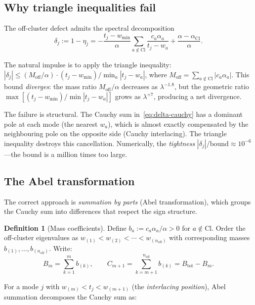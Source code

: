 \documentclass[12pt,a4paper]{article}
\theoremstyle{definition}
\newtheorem{definition}[theorem]{Definition}
\theoremstyle{remark}
\newcommand{\Cl}{\mathrm{Cl}}
\newcommand{\off}{\mathrm{off}}
\newcommand{\wmin}{w_{\min}}
\begin{document}
\subsection{Why triangle inequalities fail}

The off-cluster defect admits the spectral decomposition
\begin{equation}
\label{eq:delta-cauchy}
\delta_j := 1 - \eta_j
= -\frac{t_j - \wmin}{\alpha}
\sum_{a \notin \Cl} \frac{c_a \alpha_a}{t_j - w_a}
+ \frac{\alpha - \alpha_{\Cl}}{\alpha}.
\end{equation}

The natural impulse is to apply the triangle inequality:
$|\delta_j| \leq (M_{\off}/\alpha) \cdot (t_j - \wmin) / \min_a |t_j - w_a|$,
where $M_{\off} = \sum_{a \notin \Cl} |c_a \alpha_a|$.
This bound \emph{diverges}: the mass ratio $M_{\off}/\alpha$ decreases as
$\lambda^{-1.8}$, but the geometric ratio $\max[(t_j-\wmin)/\min|t_j-w_a|]$
grows as $\lambda^{+7}$, producing a net divergence.

The failure is structural.
The Cauchy sum in~\eqref{eq:delta-cauchy} has a dominant pole at
each mode (the nearest $w_a$), which is almost exactly compensated
by the neighbouring pole on the opposite side (Cauchy interlacing).
The triangle inequality destroys this cancellation.
Numerically, the \emph{tightness}
$|\delta_j|/\text{bound} \approx 10^{-6}$---the bound is a million times
too large.

\subsection{The Abel transformation}

The correct approach is \emph{summation by parts} (Abel transformation),
which groups the Cauchy sum into differences that respect the sign
structure.

\begin{definition}[Mass coefficients]
Define $b_a := c_a \alpha_a / \alpha > 0$ for $a \notin \Cl$.
Order the off-cluster eigenvalues as $w_{(1)} < w_{(2)} < \cdots < w_{(n_{\off})}$
with corresponding masses $b_{(1)}, \ldots, b_{(n_{\off})}$.
Write:
\begin{equation}
B_m = \sum_{k=1}^{m} b_{(k)}, \qquad
C_{m+1} = \sum_{k=m+1}^{n_{\off}} b_{(k)} = B_{\mathrm{tot}} - B_m.
\end{equation}
\end{definition}

For a mode $j$ with $w_{(m)} < t_j < w_{(m+1)}$ (the \emph{interlacing
position}), Abel summation decomposes the Cauchy sum as:
\end{document}
